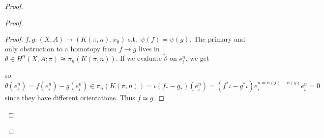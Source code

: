 \documentclass[12pt,class=article,crop=false]{standalone}
\begin{document}
\begin{proof}
\begin{proof}
\begin{proof}
$ f,g: (X,A) \to (K(\pi,n),x_0)$ s.t.\ $ \psi(f) = \psi(g)$. The primary and only obstruction to a homotopy from $ f \to g$ lives in $ \theta \in H^{n}(X,A;\pi) \cong \pi_n(K(\pi,n))$. If we evaluate $ \widetilde{ \theta}$ on $ e_i^{n}$, we get

so $ \widetilde{ \theta}(e_i^{n}) = f(e_i^{n}) - g(e_i^{n}) \in \pi_n(K(\pi,n)) = \iota (f_*-g_*)(e_i^{n}) = (f^* \iota -g^* \iota ) e_i^{n = \psi(f) - \psi(g)}e_i^{n} = 0$  since they have different orientations. Thus $ f \simeq g$.
\end{proof}
\end{proof}
\end{proof}
\end{document}
